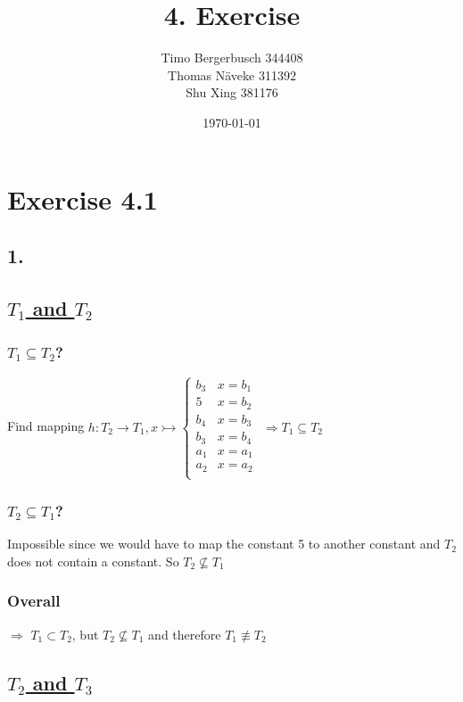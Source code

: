 \documentclass[12pt]{article}
\begin{document}
	
	\title{4. Exercise}
	\author{Timo Bergerbusch 344408 \\ Thomas Näveke 311392 \\ Shu Xing 381176}
	\date{\specialdate\today}
	\maketitle
	
	\section*{Exercise 4.1}
	\subsection*{1.}
	\subsection*{\underline{$T_1$ and $T_2$}}
	\subsubsection*{$T_1 \subseteq T_2$?}
	Find mapping $h: T_2 \rightarrow T_1, x \rightarrowtail 
		\begin{cases}
			b_3 & x=b_1 \\
			5 & x=b_2 \\
			b_4 & x=b_3 \\
			b_3 & x=b_4 \\
			a_1 & x=a_1 \\
			a_2 & x=a_2 \\
		\end{cases}$
		$\Rightarrow T_1 \subseteq T_2$
	\subsubsection*{$T_2 \subseteq T_1$?}
	Impossible since we would have to map the constant 5 to another constant and $T_2$ does not contain a constant. So $T_2 \not \subseteq T_1$
	\subsubsection*{Overall}
	$\Rightarrow$ $T_1 \subset T_2$, but $T_2 \not\subseteq T_1$ and therefore $T_1 \not\equiv T_2$
	
	\subsection*{\underline{$T_2$ and $T_3$}}
\end{document}

